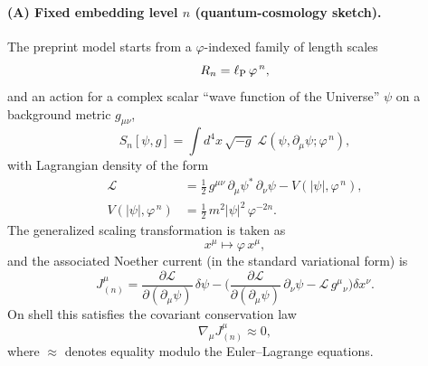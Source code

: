 \documentclass[
  reprint,
  amsmath,amssymb,
  aps,
  prd,
  superscriptaddress,
  nofootinbib,
  longbibliography
]{revtex4-2}
\newcommand{\phig}{\varphi}
\newcommand{\ellP}{\ell_{\rm P}}
\theoremstyle{definition}
\theoremstyle{remark}
\begin{document}
\paragraph{(A) Fixed embedding level $n$ (quantum-cosmology sketch).}
The preprint model starts from a $\phig$-indexed family of length scales
\begin{equation}
R_n=\ellP\,\phig^{\,n},
\end{equation}
and an action for a complex scalar ``wave function of the Universe'' $\psi$ on a background metric $g_{\mu\nu}$,
\begin{equation}
S_n[\psi,g]=\int d^4x\,\sqrt{-g}\;\mathcal{L}(\psi,\partial_\mu\psi;\phig^{\,n}),
\label{eq:Sn-fixedn}
\end{equation}
with Lagrangian density of the form
\begin{align}
\mathcal{L}
&=\frac12\, g^{\mu\nu}\,\partial_\mu\psi^\ast\,\partial_\nu\psi - V(|\psi|,\phig^{\,n}),
\nonumber\\
V(|\psi|,\phig^{\,n})
&=\frac12\,m^2|\psi|^2\,\phig^{-2n}.
\label{eq:L-fixedn}
\end{align}
The generalized scaling transformation is taken as
\begin{equation}
x^\mu \mapsto \phig\,x^\mu,
\label{eq:scale-fixedn}
\end{equation}
and the associated Noether current (in the standard variational form) is
\begin{equation}
J^\mu_{(n)}=
\frac{\partial\mathcal{L}}{\partial(\partial_\mu\psi)}\,\delta\psi
-
\Big(
\frac{\partial\mathcal{L}}{\partial(\partial_\mu\psi)}\,\partial_\nu\psi
-
\mathcal{L}\,g^\mu{}_\nu
\Big)\delta x^\nu .
\label{eq:noether-current-fixedn}
\end{equation}
On shell this satisfies the covariant conservation law
\begin{equation}
\nabla_\mu J^\mu_{(n)}\approx 0,
\label{eq:current-conservation-fixedn}
\end{equation}
where $\approx$ denotes equality modulo the Euler--Lagrange equations.
\end{document}
